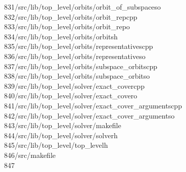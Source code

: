 \begin{tabbing}
831\>/src/lib/top\_level/orbits/orbit\_of\_subspaceso\\[0pt]
832\>/src/lib/top\_level/orbits/orbit\_repcpp\\[0pt]
833\>/src/lib/top\_level/orbits/orbit\_repo\\[0pt]
834\>/src/lib/top\_level/orbits/orbitsh\\[0pt]
835\>/src/lib/top\_level/orbits/representativescpp\\[0pt]
836\>/src/lib/top\_level/orbits/representativeso\\[0pt]
837\>/src/lib/top\_level/orbits/subspace\_orbitscpp\\[0pt]
838\>/src/lib/top\_level/orbits/subspace\_orbitso\\[0pt]
839\>/src/lib/top\_level/solver/exact\_covercpp\\[0pt]
840\>/src/lib/top\_level/solver/exact\_covero\\[0pt]
841\>/src/lib/top\_level/solver/exact\_cover\_argumentscpp\\[0pt]
842\>/src/lib/top\_level/solver/exact\_cover\_argumentso\\[0pt]
843\>/src/lib/top\_level/solver/makefile\\[0pt]
844\>/src/lib/top\_level/solver/solverh\\[0pt]
845\>/src/lib/top\_level/top\_levelh\\[0pt]
846\>/src/makefile\\[0pt]
847\>\end{tabbing}
